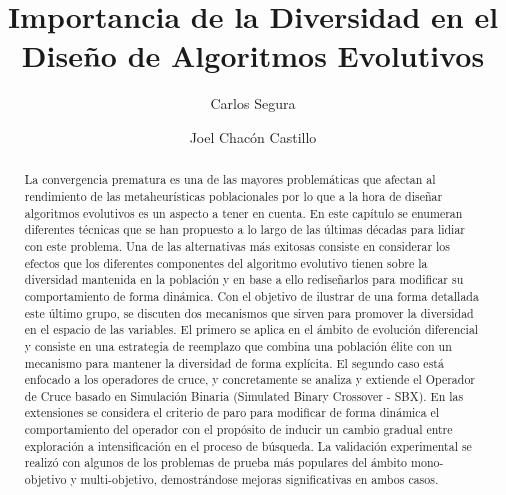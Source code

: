 \documentclass[3p]{elsarticle}
\begin{document}
\begin{frontmatter}

\title{Importancia de la Diversidad en el Diseño de Algoritmos Evolutivos}

\author[label1]{Carlos Segura}

\author[label1]{Joel Chac\'on Castillo}


\address[label1]{Área de Ciencias de Computación, Centro de Investigación de Matemáticas (CIMAT), Callej\'on Jalisco s/n, Mineral de Valenciana, Guanajuato, Guanajuato 36240, Mexico}

\begin{abstract}
La convergencia prematura es una de las mayores problemáticas que afectan al rendimiento de las metaheurísticas poblacionales por lo que
a la hora de diseñar algoritmos evolutivos es un aspecto a tener en cuenta.
%
En este capítulo se enumeran diferentes técnicas que se han propuesto a lo largo de las últimas décadas para lidiar con este problema.
%
Una de las alternativas más exitosas consiste en considerar los efectos que los diferentes componentes del algoritmo evolutivo
tienen sobre la diversidad mantenida en la población y en base a ello rediseñarlos para modificar su comportamiento de forma dinámica.
%
Con el objetivo de ilustrar de una forma detallada este último grupo, se discuten dos mecanismos que sirven para promover la diversidad en el espacio de las variables.
%
El primero se aplica en el ámbito de evolución diferencial y consiste en una estrategia de reemplazo que combina una población élite con un mecanismo para mantener 
la diversidad de forma explícita.
%
%
%
El segundo caso está enfocado a los operadores de cruce, y concretamente se analiza y extiende el Operador de Cruce basado en Simulación 
Binaria (Simulated Binary Crossover - SBX).
%
En las extensiones se considera el criterio de paro para modificar de forma dinámica el comportamiento del operador con el propósito de inducir un cambio gradual 
entre exploración a intensificación en el proceso de búsqueda.
%
La validación experimental se realizó con algunos de los problemas de prueba más populares del ámbito mono-objetivo y multi-objetivo, demostrándose mejoras significativas
en ambos casos.
%
\end{abstract}


\end{frontmatter}
\end{document}
